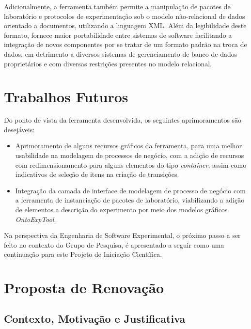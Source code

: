 Adicionalmente, a ferramenta também permite a manipulação de pacotes de laboratório e protocolos de experimentação sob o modelo não-relacional de dados orientado a documentos, utilizando a linguagem XML. Além da legibilidade deste formato, fornece maior portabilidade entre sistemas de software facilitando a integração de novos componentes por se tratar de um formato padrão na troca de dados, em detrimento a diversos sistemas de gerenciamento de banco de dados proprietários e com diversas restrições presentes no modelo relacional.


\section{Trabalhos Futuros}

Do ponto de vista da ferramenta desenvolvida, os seguintes aprimoramentos são desejáveis:

\begin{itemize}

\item Aprimoramento de alguns recursos gráficos da ferramenta, para uma melhor usabilidade na modelagem de processos de negócio, com a adição de recursos com redimensionamento para alguns elementos do tipo \textit{container}, assim como indicativos de seleção de itens na criação de transições.

\item Integração da camada de interface de modelagem de processo de negócio com a ferramenta de instanciação de pacotes de laboratório, viabilizando a adição de elementos a descrição do experimento por meio dos modelos gráficos \textit{OntoExpTool}.

\end{itemize}

Na perspectiva da Engenharia de Software Experimental, o próximo passo a ser feito no contexto do Grupo de Pesquisa, é apresentado a seguir como uma continuação para este Projeto de Iniciação Científica.


\section{Proposta de Renovação}

\subsection{Contexto, Motivação e Justificativa}


